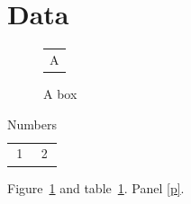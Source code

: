 \documentclass{article}
\newcounter{panel}
\begin{document}
\listoffigures
\listoftables
\section{Data}
\begin{figure}[h]
\centering
\begin{tabular}{c}A\end{tabular}
\caption{A box}\label{f}
\end{figure}
\begin{table}[h]
\centering
\caption{Numbers}\label{t}
\begin{tabular}{cc}
1 & 2
\end{tabular}
\end{table}
Figure~\ref{f} and table~\ref{t}.
\label{p}Panel \ref{p}.
\end{document}
